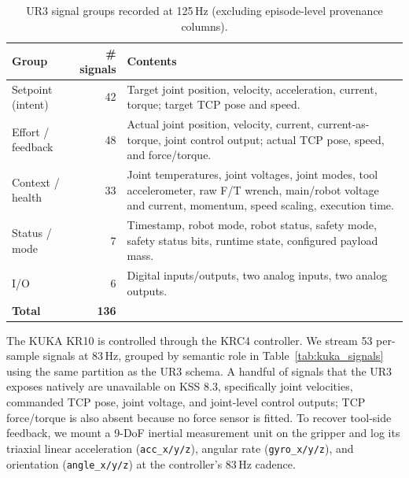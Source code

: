 \begin{table}[htbp]
    \centering
    \caption{UR3 signal groups recorded at 125\,Hz (excluding episode-level provenance columns).}
    \label{tab:ur3_signals}
    \small
    \begin{tabular}{@{}lrp{7.5cm}@{}}
        \toprule
        Group             & \# signals   & Contents                                                                                                                                                      \\
        \midrule
        Setpoint (intent) & 42           & Target joint position, velocity, acceleration, current, torque; target TCP pose and speed.                                                                    \\
        Effort / feedback & 48           & Actual joint position, velocity, current, current-as-torque, joint control output; actual TCP pose, speed, and force/torque.                                  \\
        Context / health  & 33           & Joint temperatures, joint voltages, joint modes, tool accelerometer, raw F/T wrench, main/robot voltage and current, momentum, speed scaling, execution time. \\
        Status / mode     & 7            & Timestamp, robot mode, robot status, safety mode, safety status bits, runtime state, configured payload mass.                                                 \\
        I/O               & 6            & Digital inputs/outputs, two analog inputs, two analog outputs.                                                                                                \\
        \midrule
        \textbf{Total}    & \textbf{136} &                                                                                                                                                               \\
        \bottomrule
    \end{tabular}
\end{table}

The KUKA KR10 is controlled through the KRC4 controller. We stream 53 per-sample signals at 83\,Hz, grouped by semantic role in Table~\ref{tab:kuka_signals} using the same partition as the UR3 schema. A handful of signals that the UR3 exposes natively are unavailable on KSS 8.3, specifically joint velocities, commanded TCP pose, joint voltage, and joint-level control outputs; TCP force/torque is also absent because no force sensor is fitted. To recover tool-side feedback, we mount a 9-DoF inertial measurement unit on the gripper and log its triaxial linear acceleration (\texttt{acc\_x/y/z}), angular rate (\texttt{gyro\_x/y/z}), and orientation (\texttt{angle\_x/y/z}) at the controller's 83\,Hz cadence.

